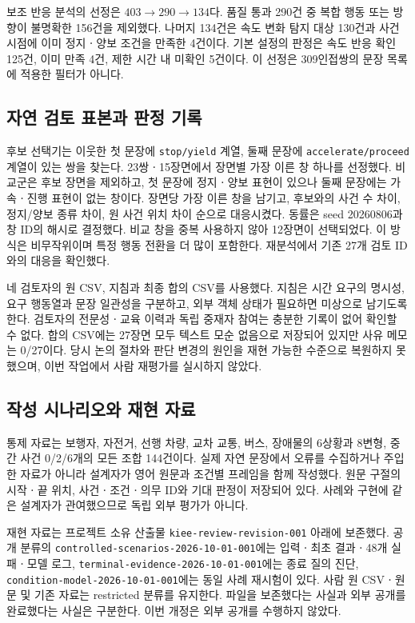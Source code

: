 \begin{revision}
보조 반응 분석의 선정은 $403\rightarrow290\rightarrow134$다. 품질 통과 290건 중 복합 행동 또는 방향이 불명확한 156건을 제외했다. 나머지 134건은 속도 변화 탐지 대상 130건과 사건 시점에 이미 정지ㆍ양보 조건을 만족한 4건이다. 기본 설정의 판정은 속도 반응 확인 125건, 이미 만족 4건, 제한 시간 내 미확인 5건이다. 이 선정은 309인접쌍의 문장 목록에 적용한 필터가 아니다.

\subsection{자연 검토 표본과 판정 기록}
\label{sec:selection}
후보 선택기는 이웃한 첫 문장에 \texttt{stop/yield} 계열, 둘째 문장에 \texttt{accelerate/proceed} 계열이 있는 쌍을 찾는다. 23쌍ㆍ15장면에서 장면별 가장 이른 창 하나를 선정했다. 비교군은 후보 장면을 제외하고, 첫 문장에 정지ㆍ양보 표현이 있으나 둘째 문장에는 가속ㆍ진행 표현이 없는 창이다. 장면당 가장 이른 창을 남기고, 후보와의 사건 수 차이, 정지/양보 종류 차이, 원 사건 위치 차이 순으로 대응시켰다. 동률은 seed 20260806과 창 ID의 해시로 결정했다. 비교 창을 중복 사용하지 않아 12장면이 선택되었다. 이 방식은 비무작위이며 특정 행동 전환을 더 많이 포함한다. 재분석에서 기존 27개 검토 ID와의 대응을 확인했다.

네 검토자의 원 CSV, 지침과 최종 합의 CSV를 사용했다. 지침은 시간 요구의 명시성, 요구 행동열과 문장 일관성을 구분하고, 외부 객체 상태가 필요하면 미상으로 남기도록 한다. 검토자의 전문성ㆍ교육 이력과 독립 중재자 참여는 충분한 기록이 없어 확인할 수 없다. 합의 CSV에는 27장면 모두 텍스트 모순 없음으로 저장되어 있지만 사유 메모는 0/27이다. 당시 논의 절차와 판단 변경의 원인을 재현 가능한 수준으로 복원하지 못했으며, 이번 작업에서 사람 재평가를 실시하지 않았다.

\subsection{작성 시나리오와 재현 자료}
\label{sec:artifacts}
통제 자료는 보행자, 자전거, 선행 차량, 교차 교통, 버스, 장애물의 6상황과 8변형, 중간 사건 0/2/6개의 모든 조합 144건이다. 실제 자연 문장에서 오류를 수집하거나 주입한 자료가 아니라 설계자가 영어 원문과 조건별 프레임을 함께 작성했다. 원문 구절의 시작ㆍ끝 위치, 사건ㆍ조건ㆍ의무 ID와 기대 판정이 저장되어 있다. 사례와 구현에 같은 설계자가 관여했으므로 독립 외부 평가가 아니다.

재현 자료는 프로젝트 소유 산출물 \texttt{kiee-review-revision-001} 아래에 보존했다. 공개 분류의 \texttt{controlled-scenarios-2026-10-01-001}에는 입력ㆍ최초 결과ㆍ48개 실패ㆍ모델 로그, \texttt{terminal-evidence-2026-10-01-001}에는 종료 질의 진단, \texttt{condition-model-2026-10-01-001}에는 동일 사례 재시험이 있다. 사람 원 CSVㆍ원문 및 기존 자료는 restricted 분류를 유지한다. 파일을 보존했다는 사실과 외부 공개를 완료했다는 사실은 구분한다. 이번 개정은 외부 공개를 수행하지 않았다.
\end{revision}
